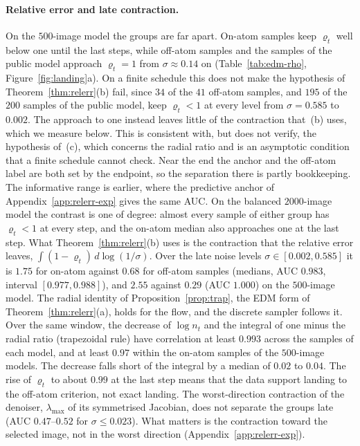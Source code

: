 \documentclass{article} %
\theoremstyle{plain}
\theoremstyle{definition}
\theoremstyle{remark}
\begin{document}
\paragraph{Relative error and late contraction.} On the $500$-image model the groups are far
apart. On-atom samples keep $\varrho_t$ well below one until the last steps, while off-atom samples
and the samples of the public model approach $\varrho_t=1$ from $\sigma\approx0.14$ on
(Table~\ref{tab:edm-rho}, Figure~\ref{fig:landing}a). On a finite schedule this does not make the
hypothesis of Theorem~\ref{thm:relerr}(b) fail, since $34$ of the $41$ off-atom samples, and $195$
of the $200$ samples of the public model, keep $\varrho_t<1$ at every level from $\sigma=0.585$ to
$0.002$. The approach to one instead leaves little of the contraction that~(b) uses, which we
measure below. This is consistent with, but does not verify, the hypothesis of~(c), which concerns
the radial ratio and is an asymptotic condition that a finite schedule cannot check. Near the end
the anchor and the off-atom label are both set by the endpoint, so the separation there is partly
bookkeeping. The informative range is earlier, where the predictive anchor of
Appendix~\ref{app:relerr-exp} gives the same AUC. On the balanced $2000$-image model the contrast is one of degree: almost every sample of either
group has $\varrho_t<1$ at every step, and the on-atom median also approaches one at the last step.
What Theorem~\ref{thm:relerr}(b) uses is the contraction that the relative error leaves,
$\int(1-\varrho_t)\,d\log(1/\sigma)$. Over the late noise levels $\sigma\in[0.002,0.585]$ it is $1.75$
for on-atom against $0.68$ for off-atom samples (medians, AUC $0.983$, interval $[0.977,0.988]$),
and $2.55$ against $0.29$ (AUC $1.000$) on the $500$-image model. The radial identity of
Proposition~\ref{prop:trap}, the EDM form of Theorem~\ref{thm:relerr}(a), holds for the flow, and
the discrete sampler follows it. Over the same window, the decrease of $\log n_t$ and the integral
of one minus the radial ratio (trapezoidal rule) have correlation at least $0.993$ across the
samples of each model, and at least $0.97$ within the on-atom samples of the $500$-image models. The
decrease falls short of the integral by a median of $0.02$ to $0.04$. The rise of $\varrho_t$ to
about $0.99$ at the last step means that the data support landing to the off-atom criterion, not
exact landing. The worst-direction contraction of the denoiser, $\lambda_{\max}$ of its symmetrised
Jacobian, does not separate the groups late (AUC $0.47$--$0.52$ for $\sigma\le0.023$). What matters
is the contraction toward the selected image, not in the worst direction
(Appendix~\ref{app:relerr-exp}).
\end{document}
